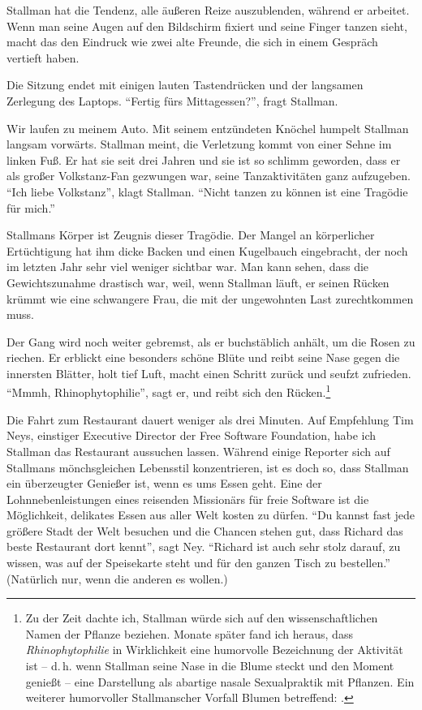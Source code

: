 Stallman hat die Tendenz, alle äußeren Reize auszublenden, während er arbeitet. Wenn man seine Augen auf den Bildschirm fixiert und seine Finger tanzen sieht, macht das den Eindruck wie zwei alte Freunde, die sich in einem Gespräch vertieft haben.

Die Sitzung endet mit einigen lauten Tastendrücken und der langsamen Zerlegung des Laptops.
"`Fertig fürs Mittagessen?"', fragt Stallman.

Wir laufen zu meinem Auto. Mit seinem entzündeten Knöchel humpelt Stallman langsam vorwärts. Stallman meint, die Verletzung kommt von einer Sehne im linken Fuß. Er hat sie seit drei Jahren und sie ist so schlimm geworden, dass er als großer  Volkstanz-Fan gezwungen war, seine Tanzaktivitäten ganz aufzugeben. "`Ich liebe Volkstanz"', klagt Stallman. "`Nicht tanzen zu können ist eine Tragödie für mich."'

Stallmans Körper ist Zeugnis dieser Tragödie. Der Mangel an körperlicher Ertüchtigung hat ihm dicke Backen und einen Kugelbauch eingebracht, der noch im letzten Jahr sehr viel weniger sichtbar war. Man kann sehen, dass die Gewichtszunahme drastisch war, weil, wenn Stallman läuft, er seinen Rücken krümmt wie eine schwangere Frau, die mit der ungewohnten Last zurechtkommen muss.

Der Gang wird noch weiter gebremst, als er buchstäblich anhält, um die Rosen zu riechen. Er erblickt eine besonders schöne Blüte und reibt seine Nase gegen die innersten Blätter, holt tief Luft, macht einen Schritt zurück und seufzt zufrieden.
"`Mmmh, Rhinophytophilie"', sagt er, und reibt sich den Rücken.\footnote{Zu der Zeit dachte ich, Stallman würde sich auf den wissenschaftlichen Namen der Pflanze beziehen. Monate später fand ich heraus, dass \textit{Rhinophytophilie} in Wirklichkeit eine humorvolle Bezeichnung der Aktivität ist – d.\,h. wenn Stallman seine Nase in die Blume steckt und den Moment genießt – eine Darstellung als abartige nasale Sexualpraktik mit Pflanzen. Ein weiterer humorvoller Stallmanscher Vorfall Blumen betreffend: \cite{rmsdallas}.}

Die Fahrt zum Restaurant dauert weniger als drei Minuten. Auf Empfehlung Tim Neys, einstiger Executive Director der Free Software Foundation, habe ich Stallman das Restaurant aussuchen lassen. Während einige Reporter sich auf Stallmans mönchsgleichen Lebensstil konzentrieren, ist es doch so, dass Stallman ein überzeugter Genießer ist, wenn es ums Essen geht. Eine der Lohnnebenleistungen eines reisenden Missionärs für freie Software ist die Möglichkeit, delikates Essen aus aller Welt kosten zu dürfen. "`Du kannst fast jede größere Stadt der Welt besuchen und die Chancen stehen gut, dass Richard das beste Restaurant dort kennt"', sagt Ney. "`Richard ist auch sehr stolz darauf, zu wissen, was auf der Speisekarte steht und für den ganzen Tisch zu bestellen."' (Natürlich nur, wenn die anderen es wollen.)

